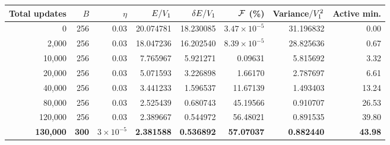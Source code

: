 \begin{tabular}{@{}rrrrrrrr@{}}
\toprule
Total updates & $B$ & $\eta$ & $E/V_1$ & $\delta E/V_1$ & $\mathcal F$ (\%) & Variance$/V_1^2$ & Active min.\\
\midrule
0 & 256 & $0.03$ & 20.074781 & 18.230085 & $3.47\!\times\!10^{-5}$ & 31.196832 & 0.00\\
2,000 & 256 & $0.03$ & 18.047236 & 16.202540 & $8.39\!\times\!10^{-5}$ & 28.825636 & 0.67\\
10,000 & 256 & $0.03$ & 7.765967 & 5.921271 & 0.09631 & 5.815692 & 3.32\\
20,000 & 256 & $0.03$ & 5.071593 & 3.226898 & 1.66170 & 2.787697 & 6.61\\
40,000 & 256 & $0.03$ & 3.441233 & 1.596537 & 11.67139 & 1.493403 & 13.24\\
80,000 & 256 & $0.03$ & 2.525439 & 0.680743 & 45.19566 & 0.910707 & 26.53\\
120,000 & 256 & $0.03$ & 2.389667 & 0.544972 & 56.48021 & 0.891535 & 39.80\\
\textbf{130,000} & \textbf{300} & {\boldmath $3\!\times\!10^{-5}$} & \textbf{2.381588} & \textbf{0.536892} & \textbf{57.07037} & \textbf{0.882440} & \textbf{43.98}\\
\bottomrule
\end{tabular}
